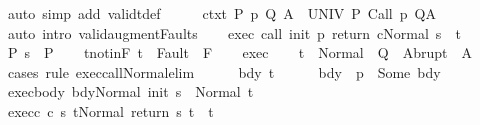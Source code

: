 \begin{isabellebody}
\ {\isacharparenleft}auto\ simp\ add{\isacharcolon}\ validt{\isacharunderscore}def{\isacharparenright}\isanewline
\ \ \isamarkupfalse%
\ \isamarkupfalse%
\ ctxt{\isacharprime}{\isacharcolon}\ {\isachardoublequoteopen}{\isasymforall}{\isacharparenleft}P{\isacharcomma}\ p{\isacharcomma}\ Q{\isacharcomma}\ A{\isacharparenright}{\isasymin}{\isasymTheta}{\isachardot}\ {\isasymGamma}\ {\isasymTurnstile}\isactrlbsub {\isacharslash}UNIV\isactrlesub \ P\ {\isacharparenleft}Call\ p{\isacharparenright}\ Q{\isacharcomma}A{\isachardoublequoteclose}\isanewline
\ \ \ \ \isamarkupfalse%
\ {\isacharparenleft}auto\ intro{\isacharcolon}\ valid{\isacharunderscore}augment{\isacharunderscore}Faults{\isacharparenright}\isanewline
\ \ \isamarkupfalse%
\ exec{\isacharcolon}\ {\isachardoublequoteopen}{\isasymGamma}{\isasymturnstile}{\isasymlangle}call\ init\ p\ return\ c{\isacharcomma}Normal\ s{\isasymrangle}\ {\isasymRightarrow}\ t{\isachardoublequoteclose}\isanewline
\ \ \isamarkupfalse%
\ P{\isacharcolon}\ {\isachardoublequoteopen}s\ {\isasymin}\ P{\isachardoublequoteclose}\isanewline
\ \ \isamarkupfalse%
\ t{\isacharunderscore}notin{\isacharunderscore}F{\isacharcolon}\ {\isachardoublequoteopen}t\ {\isasymnotin}\ Fault\ {\isacharbackquote}\ F{\isachardoublequoteclose}\isanewline
\ \ \isamarkupfalse%
\ exec\isanewline
\ \ \isamarkupfalse%
\ {\isachardoublequoteopen}t\ {\isasymin}\ Normal\ {\isacharbackquote}\ Q\ {\isasymunion}\ Abrupt\ {\isacharbackquote}\ A{\isachardoublequoteclose}\isanewline
\ \ \isamarkupfalse%
\ {\isacharparenleft}cases\ rule{\isacharcolon}\ exec{\isacharunderscore}call{\isacharunderscore}Normal{\isacharunderscore}elim{\isacharparenright}\isanewline
\ \ \ \ \isamarkupfalse%
\ bdy\ t{\isacharprime}\isanewline
\ \ \ \ \isamarkupfalse%
\ bdy{\isacharcolon}\ {\isachardoublequoteopen}{\isasymGamma}\ p\ {\isacharequal}\ Some\ bdy{\isachardoublequoteclose}\isanewline
\ \ \ \ \isamarkupfalse%
\ exec{\isacharunderscore}body{\isacharcolon}\ {\isachardoublequoteopen}{\isasymGamma}{\isasymturnstile}{\isasymlangle}bdy{\isacharcomma}Normal\ {\isacharparenleft}init\ s{\isacharparenright}{\isasymrangle}\ {\isasymRightarrow}\ Normal\ t{\isacharprime}{\isachardoublequoteclose}\ \isanewline
\ \ \ \ \isamarkupfalse%
\ exec{\isacharunderscore}c{\isacharcolon}\ {\isachardoublequoteopen}{\isasymGamma}{\isasymturnstile}{\isasymlangle}c\ s\ t{\isacharprime}{\isacharcomma}Normal\ {\isacharparenleft}return\ s\ t{\isacharprime}{\isacharparenright}{\isasymrangle}\ {\isasymRightarrow}\ t{\isachardoublequoteclose}\ \isanewline

\end{isabellebody}
